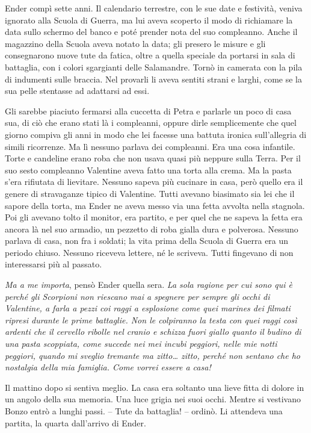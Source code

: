 {Ender compì sette anni. Il calendario terrestre, con le sue date e
	festività, veniva ignorato alla Scuola di Guerra, ma lui aveva scoperto
	il modo di richiamare la data sullo schermo del banco e poté prender
	nota del suo compleanno. Anche il magazzino della Scuola aveva notato la
	data; gli presero le misure e gli consegnarono nuove tute da fatica,
	oltre a quella speciale da portarsi in sala di battaglia, con i colori
	sgargianti delle Salamandre. Tornò in camerata con la pila di indumenti
	sulle braccia. Nel provarli li aveva sentiti strani e larghi, come se la
	sua pelle stentasse ad adattarsi ad essi.}

{Gli sarebbe piaciuto fermarsi alla cuccetta di Petra e parlarle un poco
	di casa sua, di ciò che erano stati là i compleanni, oppure dirle
	semplicemente che quel giorno compiva gli anni in modo che lei facesse
	una battuta ironica sull'allegria di simili ricorrenze. Ma lì nessuno
	parlava dei compleanni. Era una cosa infantile. Torte e candeline erano
	roba che non usava quasi più neppure sulla Terra. Per il suo sesto
	compleanno Valentine aveva fatto una torta alla crema. Ma la pasta s'era
	rifiutata di lievitare. Nessuno sapeva più cucinare in casa, però quello
	era il genere di stravaganze tipico di Valentine. Tutti avevano
	biasimato sia lei che il sapore della torta, ma Ender ne aveva messo via
	una fetta avvolta nella stagnola. Poi gli avevano tolto il monitor, era
	partito, e per quel che ne sapeva la fetta era ancora là nel suo
	armadio, un pezzetto di roba gialla dura e polverosa. Nessuno parlava di
	casa, non fra i soldati; la vita prima della Scuola di Guerra era un
	periodo chiuso. Nessuno riceveva lettere, né le scriveva. Tutti
	fingevano di non interessarsi più al passato.}

\emph{{Ma a me importa}}{, \emph{} pensò Ender quella sera. \emph{La
		sola ragione per cui sono qui è perché gli Scorpioni non riescano mai a
		spegnere per sempre gli occhi di Valentine, a farla a pezzi coi raggi a
		esplosione come quei marines dei filmati ripresi durante le prime
		battaglie. Non le colpiranno la testa con quei raggi così ardenti che il
		cervello ribolle nel cranio e schizza fuori giallo quanto il budino di
		una pasta scoppiata, come succede nei mei incubi peggiori, nelle mie
		notti peggiori, quando mi sveglio tremante ma zitto\ldots{} zitto,
		perché non sentano che ho nostalgia della mia famiglia. Come vorrei
		essere a casa!}}

{Il mattino dopo si sentiva meglio. La casa era soltanto una lieve fitta
	di dolore in un angolo della sua memoria. Una luce grigia nei suoi
	occhi. Mentre si vestivano Bonzo entrò a lunghi passi. -- Tute da
	battaglia! -- ordinò. Li attendeva una partita, la quarta dall'arrivo di
	Ender.}

